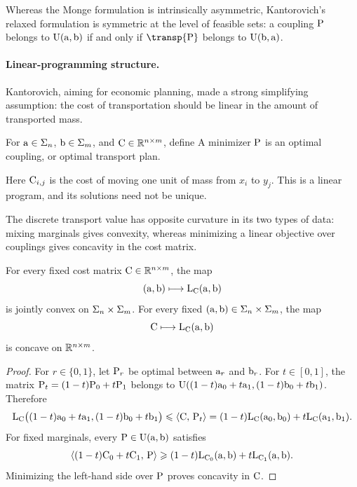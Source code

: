 Whereas the Monge formulation is intrinsically asymmetric, Kantorovich's relaxed formulation is symmetric at the level of feasible sets: a coupling $\P$ belongs to $\CouplingsD(\a,\b)$ if and only if $\transp{\P}$ belongs to $\CouplingsD(\b,\a)$.

\paragraph{Linear-programming structure.}

Kantorovich, aiming for economic planning, made a strong simplifying assumption: the cost of transportation should be linear in the amount of transported mass.
\begin{defn}\label{def-discrete-kantorovich-problem}
	For $\a\in\simplex_n$, $\b\in\simplex_m$, and $\C\in\RR^{n\times m}$, define
A minimizer $\P$ is an optimal coupling, or optimal transport plan.
\end{defn}
Here $\C_{i,j}$ is the cost of moving one unit of mass from $x_i$ to $y_j$.
This is a linear program, and its solutions need not be unique.

The discrete transport value has opposite curvature in its two types of data: mixing marginals gives convexity, whereas minimizing a linear objective over couplings gives concavity in the cost matrix.
\begin{prop}\label{prop-discrete-kantorovich-joint-convexity}
	For every fixed cost matrix $\C\in\RR^{n\times m}$, the map
	\[
		(\a,\b)\longmapsto\MKD_{\C}(\a,\b)
	\]
	is jointly convex on $\simplex_n\times\simplex_m$. For every fixed $(\a,\b)\in\simplex_n\times\simplex_m$, the map
	\[
		\C\longmapsto\MKD_{\C}(\a,\b)
	\]
	is concave on $\RR^{n\times m}$.
\end{prop}

\begin{proof}
	For $r\in\{0,1\}$, let $\P_r$ be optimal between $\a_r$ and $\b_r$. For $t\in[0,1]$, the matrix $\P_t=(1-t)\P_0+t\P_1$ belongs to $\CouplingsD((1-t)\a_0+t\a_1,(1-t)\b_0+t\b_1)$. Therefore
	\[
		\MKD_{\C}\big((1-t)\a_0+t\a_1,(1-t)\b_0+t\b_1\big)
		\leq
		\dotp{\C}{\P_t}
		=
		(1-t)\MKD_{\C}(\a_0,\b_0)+t\MKD_{\C}(\a_1,\b_1).
	\]
	For fixed marginals, every $\P\in\CouplingsD(\a,\b)$ satisfies
	\[
		\dotp{(1-t)\C_0+t\C_1}{\P}
		\geq
		(1-t)\MKD_{\C_0}(\a,\b)
		+t\MKD_{\C_1}(\a,\b).
	\]
	Minimizing the left-hand side over $\P$ proves concavity in $\C$.
\end{proof}

